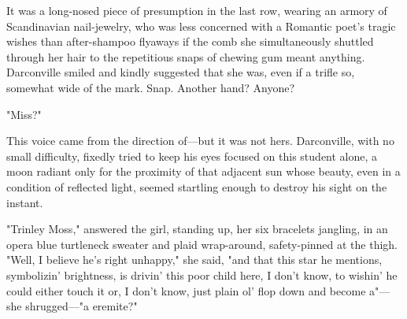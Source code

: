   It was a long-nosed piece of presumption 
in the last row, wearing an armory 
of Scandinavian nail-jewelry, who was less concerned with a Romantic poet's 
tragic wishes than after-shampoo flyaways if the comb she simultaneously 
shuttled through her hair to the repetitious snaps 
of chewing gum meant anything.
Darconville smiled and kindly suggested that she was, even if a trifle so,
somewhat wide of the mark. Snap. Another hand? Anyone?

  "Miss?"

  This voice came from the direction of---but it was not hers. Darconville, with
no small difficulty, fixedly tried to keep his eyes focused on this student
alone, a moon radiant only for the proximity of that adjacent sun whose beauty,
even in a condition of reflected light, seemed startling enough to destroy his
sight on the instant.

  "Trinley Moss," answered the girl, standing up, her six bracelets jangling, 
in an opera blue turtleneck sweater and plaid wrap-around, safety-pinned at the
thigh. "Well, I believe he's right unhappy," she said, "and that this star he
mentions, symbolizin' brightness, is drivin' this poor child here, I don't know,
to wishin' he could either touch it or, I don't know, just plain ol' flop down
and become a"---she shrugged---"a eremite?"

